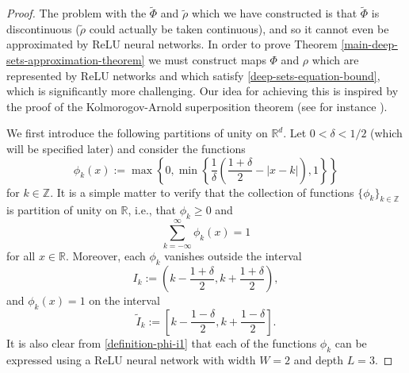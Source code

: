 \documentclass[twoside,11pt]{article}
\begin{document}
\begin{proof}
The problem with the $\widetilde{\Phi}$ and $\widetilde{\rho}$ which we have constructed is that $\widetilde{\Phi}$ is discontinuous ($\widetilde{\rho}$ could actually be taken continuous), and so it cannot even be approximated by ReLU neural networks. In order to prove Theorem \ref{main-deep-sets-approximation-theorem} we must construct maps $\Phi$ and $\rho$ which are represented by ReLU networks and which satisfy \eqref{deep-sets-equation-bound}, which is significantly more challenging. Our idea for achieving this is inspired by the proof of the Kolmorogov-Arnold superposition theorem (see for instance \cite{kolmogorov1957representations,kahane1975theoreme}).

We first introduce the following partitions of unity on $\mathbb{R}^d$. Let $0 < \delta < 1/2$ (which will be specified later) and consider the functions
\begin{equation}\label{definition-phi-i1}
        \phi_k(x) := \max\left\{0,\min\left\{\frac{1}{\delta}\left(\frac{1+\delta}{2} - \left|x - k\right|\right), 1\right\}\right\}
    \end{equation}
    for $k\in \mathbb{Z}$. It is a simple matter to verify that the collection of functions $\{\phi_k\}_{k\in\mathbb{Z}}$ is partition of unity on $\mathbb{R}$, i.e., that $\phi_k \geq 0$ and
    $$
        \sum_{k=-\infty}^{\infty}\phi_k(x) = 1
    $$
    for all $x\in \mathbb{R}$. Moreover, each $\phi_k$ vanishes outside the interval $$I_k := \left(k-\frac{1+\delta}{2}, k+\frac{1+\delta}{2}\right),$$
    and $\phi_k(x) = 1$ on the interval
    \begin{equation}
        \tilde{I}_k := \left[k-\frac{1-\delta}{2}, k+\frac{1-\delta}{2}\right].
    \end{equation}
    It is also clear from \eqref{definition-phi-i1} that each of the functions $\phi_k$ can be expressed using a ReLU neural network with width $W = 2$ and depth $L = 3$. 


\end{proof}
\end{document}
